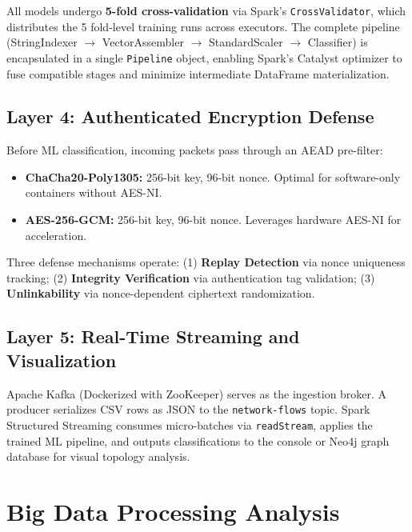 \documentclass[conference]{IEEEtran}
\begin{document}
All models undergo \textbf{5-fold cross-validation} via Spark's \texttt{CrossValidator}, which distributes the 5 fold-level training runs across executors. The complete pipeline (StringIndexer $\rightarrow$ VectorAssembler $\rightarrow$ StandardScaler $\rightarrow$ Classifier) is encapsulated in a single \texttt{Pipeline} object, enabling Spark's Catalyst optimizer to fuse compatible stages and minimize intermediate DataFrame materialization.

\subsection{Layer 4: Authenticated Encryption Defense}

Before ML classification, incoming packets pass through an AEAD pre-filter:

\begin{itemize}
    \item \textbf{ChaCha20-Poly1305:} 256-bit key, 96-bit nonce. Optimal for software-only containers without AES-NI.
    \item \textbf{AES-256-GCM:} 256-bit key, 96-bit nonce. Leverages hardware AES-NI for acceleration.
\end{itemize}

Three defense mechanisms operate: (1) \textbf{Replay Detection} via nonce uniqueness tracking; (2) \textbf{Integrity Verification} via authentication tag validation; (3) \textbf{Unlinkability} via nonce-dependent ciphertext randomization.

\subsection{Layer 5: Real-Time Streaming and Visualization}

Apache Kafka (Dockerized with ZooKeeper) serves as the ingestion broker. A producer serializes CSV rows as JSON to the \texttt{network-flows} topic. Spark Structured Streaming consumes micro-batches via \texttt{readStream}, applies the trained ML pipeline, and outputs classifications to the console or Neo4j graph database for visual topology analysis.


\section{Big Data Processing Analysis}
\end{document}

